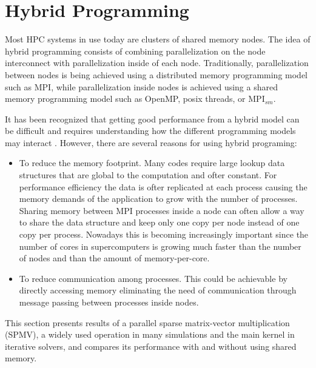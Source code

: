 \section{Hybrid Programming} %

Most HPC systems in use today are clusters of shared memory nodes. The idea of hybrid programming consists of combining parallelization on the node interconnect with parallelization inside of each node. Traditionally, parallelization between nodes is being achieved using a distributed memory programming model such as MPI, while parallelization inside nodes is achieved using a shared memory programming model such as OpenMP, posix threads, or MPI$_{sm}$. 

\medskip
It has been recognized that getting good performance from a hybrid model can be difficult and requires understanding how the different programming models may interact \cite{UsingAdvancedMPI}. However, there are several reasons for using hybrid programing:

\begin{itemize} 

\item To reduce the memory footprint. Many codes require large lookup data structures that are global to the computation and ofter constant. For performance efficiency the data is ofter replicated at each process causing the memory demands of the application to grow with the number of processes. Sharing memory between MPI processes inside a node can often allow a way to share the data structure and keep only one copy per node instead of one copy per process. Nowadays this is becoming increasingly important since the number of cores in supercomputers is growing much faster than the number of nodes and than the amount of memory-per-core.

\item To reduce communication among processes. This could be achievable by directly accessing memory eliminating the need of communication through message passing between processes inside nodes.


\end{itemize}


\medskip

This section presents results of a parallel sparse matrix-vector multiplication (SPMV), a widely used operation in many simulations and the main kernel in iterative solvers, and compares its performance with and without using shared memory.


\medskip


